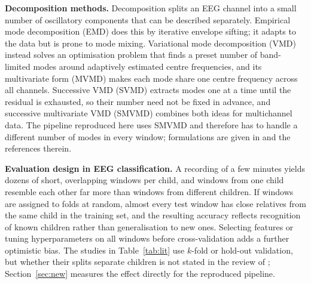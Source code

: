 \documentclass[11pt,a4paper]{article}
\begin{document}
\textbf{Decomposition methods.} Decomposition splits an EEG channel into a
small number of oscillatory components that can be described separately.
Empirical mode decomposition (EMD) does this by iterative envelope sifting; it
adapts to the data but is prone to mode mixing. Variational mode decomposition
(VMD) instead solves an optimisation problem that finds a preset number of
band-limited modes around adaptively estimated centre frequencies, and its
multivariate form (MVMD) makes each mode share one centre frequency across all
channels. Successive VMD (SVMD) extracts modes one at a time until the residual
is exhausted, so their number need not be fixed in advance, and successive
multivariate VMD (SMVMD) combines both ideas for multichannel data. The
pipeline reproduced here uses SMVMD and therefore has to handle a different
number of modes in every window; formulations are given in \cite{chandela2025}
and the references therein.

\textbf{Evaluation design in EEG classification.} A recording of a few minutes
yields dozens of short, overlapping windows per child, and windows from one
child resemble each other far more than windows from different children. If
windows are assigned to folds at random, almost every test window has close
relatives from the same child in the training set, and the resulting accuracy
reflects recognition of known children rather than generalisation to new
ones. Selecting features or tuning hyperparameters on all windows before
cross-validation adds a further optimistic bias. The studies in
Table~\ref{tab:lit} use $k$-fold or hold-out validation, but whether their
splits separate children is not stated in the review of \cite{chandela2025};
Section~\ref{sec:new} measures the effect directly for the reproduced pipeline.
\end{document}
